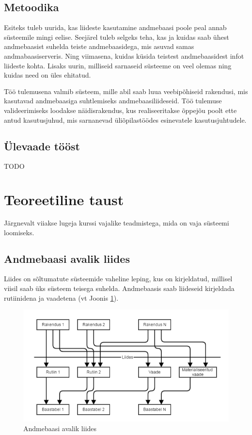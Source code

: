 \documentclass[a4paper,12pt]{article} %
\begin{document}
\subsection{Metoodika}
Esiteks tuleb uurida, kas liideste kasutamine andmebaasi poole peal annab süsteemile mingi eelise. Seejärel tuleb selgeks teha, kas ja kuidas saab ühest andmebaasist suhelda teiste andmebaasidega, mis asuvad samas andmabaasiserveris. Ning viimasena, kuidas küsida teistest andmebaasidest infot liideste kohta.
Lisaks uurin, milliseid sarnaseid süsteeme on veel olemas ning kuidas need on üles ehitatud.\par
Töö tulemusena valmib süsteem, mille abil saab luua veebipõhiseid rakendusi, mis kasutavad andmebaasiga suhtlemiseks andmebaasiliideseid. Töö tulemuse valideerimiseks loodakse näidisrakendus, kus realiseeritakse õppejõu poolt ette antud kasutusjuhud, mis sarnanevad üliõpilastöödes esinevatele kasutusjuhtudele.
\subsection{Ülevaade tööst}
TODO
\pagebreak

\section{Teoreetiline taust}
Järgnevalt viiakse lugeja kurssi vajalike teadmistega, mida on vaja süsteemi loomiseks.

\subsection{Andmebaasi avalik liides}
\label{andmebaasi_avalik_liides}
Liides on sõltumatute süsteemide vaheline leping, kus on kirjeldatud, millisel viisil saab üks süsteem teisega suhelda.
Andmebaasis saab liideseid kirjeldada rutiinidena ja vaadetena (vt Joonis \ref{fig_andmebaasi_avalik_liides}).

\begin{figure}[H]
\begin{center}
\includegraphics[bb=0 0 606 330,scale=0.6]{./diagrams/db-interface.png}
\caption{Andmebaasi avalik liides}
\label{fig_andmebaasi_avalik_liides}
\end{center}
\end{figure}
\end{document}
